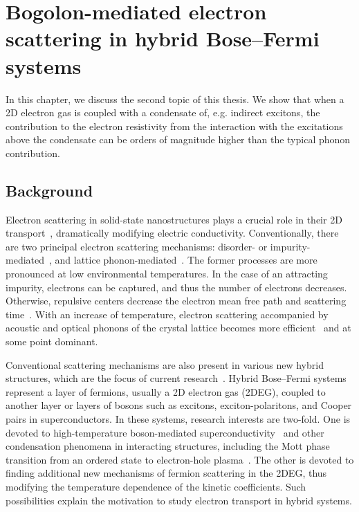 \chapter{Bogolon-mediated electron scattering in hybrid Bose--Fermi systems}\label{Ch6}
%
%
In this chapter, we discuss the second topic of this thesis.
We show that when a 2D electron gas is coupled with a condensate of, e.g. indirect excitons, the contribution to the electron resistivity from the interaction with the excitations above the condensate can be orders of magnitude higher than the typical phonon contribution.
\section{Background}
Electron scattering in solid-state nanostructures plays a crucial role in their 2D transport~\cite{Kawamura:1992aa,Hwang:2008aa}, dramatically modifying electric conductivity.
%
Conventionally, there are two principal electron scattering mechanisms: disorder- or impurity-mediated~\cite{Jena:2007aa,Gibbons:2009aa}, and lattice phonon-mediated~\cite{Kawamura:1992aa}. The former processes are more pronounced at low environmental temperatures.
%
In the case of an attracting impurity, electrons can be captured, and thus the number of electrons decreases. Otherwise, repulsive centers decrease the electron mean free path and scattering time~\cite{Shi:2012aa,Bourgoin:1992aa,Eshchenko:2002aa,Palma:1995aa,Boev:2018ab}.
%
With an increase of temperature, electron scattering accompanied by acoustic and optical phonons of the crystal lattice becomes more efficient~\cite{Gummel:1955aa, Lax:1960aa, Abakumov:1976aa} and at some point dominant.

Conventional scattering mechanisms are also present in various new hybrid structures, which are the focus of current research~\cite{Cotlet:2016aa,Laussy:2010aa,Sau:2010aa,Alicea:2010aa,Mourik:2012aa}.
Hybrid Bose--Fermi systems represent a layer of fermions, usually a 2D electron gas (2DEG), coupled to another layer or layers of bosons such as excitons, exciton-polaritons, and Cooper pairs in superconductors.
In these systems, research interests are two-fold. One is devoted to high-temperature boson-mediated  superconductivity~\cite{Skopelitis:2018aa} and other condensation phenomena in interacting structures, including the Mott phase transition from an ordered state to electron-hole plasma~\cite{Kochereshko:2016aa}.
The other is devoted to finding additional new mechanisms of fermion scattering in the 2DEG, thus modifying the temperature dependence of the kinetic coefficients. Such possibilities explain the motivation to study electron transport in hybrid systems.

